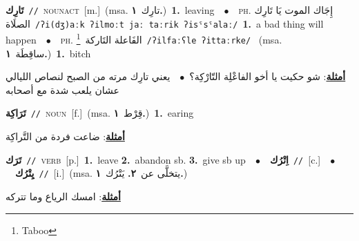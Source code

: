 \documentclass[10pt,a4paper,twoside]{article} %
\begin{document}
\begin{multicols}{2}
{\setlength\topsep{0pt}\textbf{\foreignlanguage{arabic}{تَارِك}}\ {\color{gray}\texttt{//}\color{black}}\ \textsc{noun\textunderscore act}\ [m.]\ \color{gray}(msa. \foreignlanguage{arabic}{تارِك}~\foreignlanguage{arabic}{\textbf{١.}})\color{black}\ \textbf{1.}~leaving\ \ $\bullet$\ \ \textsc{ph.} \color{gray} \foreignlanguage{arabic}{إِجَاك الموت يَا تَارِك الصلَاة}\color{black}\ {\color{gray}\texttt{/{\sffamily ʔi(dʒ)aːk ʔilmoːt jaː taːrik ʔisˤsˤalaː}/}\color{black}}\ \textbf{1.}~a bad thing will happen\ \ $\bullet$\ \ \textsc{ph.} \color{gray} \foreignlanguage{arabic}{الفَاعلة التَاركة}\color{black}\ \footnote{Taboo}\ {\color{gray}\texttt{/{\sffamily ʔilfaːʕle ʔittaːrke}/}\color{black}}\ \color{gray} (msa. \foreignlanguage{arabic}{ساقِطَة}~\foreignlanguage{arabic}{\textbf{١.}})\color{black}\ \textbf{1.}~bitch\  \begin{flushright}\color{gray}\foreignlanguage{arabic}{\textbf{\underline{\foreignlanguage{arabic}{أمثلة}}}: شو حكيت يا أخو الفاعْلِة التّارْكِة؟\ $\bullet$\ \  يعني تارِك مرته من الصبح لنصاص الليالي عشان يلعب شدة مع أصحابه}\end{flushright}\color{black}} \vspace{2mm}

{\setlength\topsep{0pt}\textbf{\foreignlanguage{arabic}{تَرَاكِة}}\ {\color{gray}\texttt{//}\color{black}}\ \textsc{noun}\ [f.]\ \color{gray}(msa. \foreignlanguage{arabic}{قِرْط}~\foreignlanguage{arabic}{\textbf{١.}})\color{black}\ \textbf{1.}~earing\  \begin{flushright}\color{gray}\foreignlanguage{arabic}{\textbf{\underline{\foreignlanguage{arabic}{أمثلة}}}: ضاعت فردة من التَّراكِة}\end{flushright}\color{black}} \vspace{2mm}

{\setlength\topsep{0pt}\textbf{\foreignlanguage{arabic}{تَرَك}}\ {\color{gray}\texttt{//}\color{black}}\ \textsc{verb}\ [p.]\ \textbf{1.}~leave  \textbf{2.}~abandon sb.  \textbf{3.}~give sb up\ \ $\bullet$\ \ \setlength\topsep{0pt}\textbf{\foreignlanguage{arabic}{اِتْرُك}}\ {\color{gray}\texttt{//}\color{black}}\ [c.]\ \ $\bullet$\ \ \setlength\topsep{0pt}\textbf{\foreignlanguage{arabic}{يِتْرُك}}\ {\color{gray}\texttt{//}\color{black}}\ [i.]\ \color{gray}(msa. \foreignlanguage{arabic}{يتخلَّى عن}~\foreignlanguage{arabic}{\textbf{٢.}}  \foreignlanguage{arabic}{يَتْرُك}~\foreignlanguage{arabic}{\textbf{١.}})\color{black}\  \begin{flushright}\color{gray}\foreignlanguage{arabic}{\textbf{\underline{\foreignlanguage{arabic}{أمثلة}}}: امسك الرياع وما تتركه}\end{flushright}\color{black}} \vspace{2mm}


\end{multicols}
\end{document}
